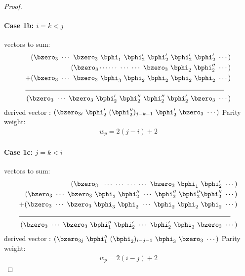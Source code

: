 \documentclass[11pt, oneside, dvipdfmx]{book}
\begin{document}
\begin{proof}
\paragraph{Case 1b: $i=k<j$ \newline}
 vectors to sum:
 \begin{align*}
(\bzero_{3}~\cdots~\bzero_{3}~\bphi_1~\bphi'_2~\bphi'_2~\bphi'_2~\bphi'_2~\cdots)\\
(\bzero_{3}\cdots\cdots~\cdots~\cdots~\bzero_{3}~\bphi_2~\bphi''_2~\cdots)\\
+(\bzero_{3}~\cdots~\bzero_{3}~\bphi_3~\bphi_2~\bphi_2~\bphi_2~\bphi_2~\cdots)\\
\cline{1-2}
(\bzero_{3}~\cdots~\bzero_{3}~\bphi'_2~\bphi''_2~\bphi''_2~\bphi'_2~\bzero_3~\cdots)
\end{align*}
derived vector : $(\bzero_{3i}~\bphi'_2~(\bphi''_2)_{j-k-1}~\bphi'_2~\bzero_3~\cdots)$
\newline
Parity weight: \begin{equation}
\begin{split}
w_p=2(j-i)+2
\end{split}
\end{equation}

\paragraph{Case 1c: $j=k<i$\newline}
 vectors to sum:
\begin{align*}
(\bzero_{3}~~\cdots~\cdots~\cdots~\cdots~\bzero_{3}~\bphi_1~\bphi'_2~\cdots)\\
(\bzero_{3}~\cdots~\bzero_{3}~\bphi_2~\bphi''_2~\cdots~\bphi''_2~\bphi''_2\bphi''_2~\cdots)\\
+(\bzero_{3}~\cdots~\bzero_{3}~\bphi_3~\bphi_2~\cdots~\bphi_2~\bphi_2~\bphi_2~\cdots)\\
\cline{1-2}
(\bzero_{3}~\cdots~\bzero_{3}~\bphi''_1~\bphi'_2~\cdots~\bphi'_2~\bphi_3~\bzero_3~\cdots)
\end{align*}
derived vector : $(\bzero_{3j}~\bphi''_1~(\bphi_2)_{i-j-1}~\bphi_3~\bzero_3~\cdots)$\newline
Parity weight: \begin{equation}
\begin{split}
w_p=2(i-j)+2
\end{split}
\end{equation}
\newpage

\end{proof}
\end{document}
